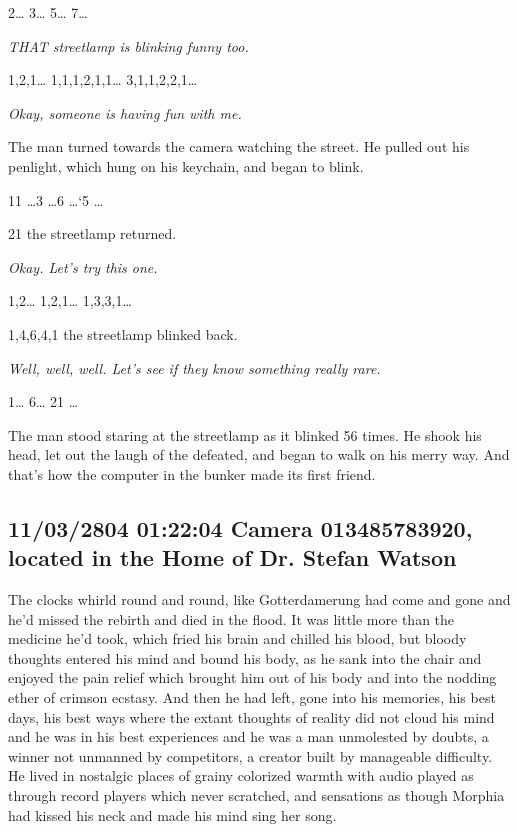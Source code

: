 \documentclass[12pt]{article}
\begin{document}
2\ldots{} 3\ldots{} 5\ldots{} 7\ldots{}

\emph{THAT streetlamp is blinking funny too.}

1,2,1\ldots{} 1,1,1,2,1,1\ldots{} 3,1,1,2,2,1\ldots{}

\emph{Okay, someone is having fun with me.}

The man turned towards the camera watching the street. He pulled out his penlight, which hung on his keychain, and began to blink.

11 \ldots{}3 \ldots{}6 \ldots{}`5 \ldots{}

21 the streetlamp returned.

\emph{Okay. Let's try this one.}

1,2\ldots{} 1,2,1\ldots{} 1,3,3,1\ldots{}

1,4,6,4,1 the streetlamp blinked back.

\emph{Well, well, well. Let's see if they know something really rare.}

1\ldots{} 6\ldots{} 21 \ldots{}

The man stood staring at the streetlamp as it blinked 56 times. He shook his head, let out the laugh of the defeated, and began to walk on his merry way.
And that's how the computer in the bunker made its first friend.

\subsection*{11/03/2804 01:22:04 Camera 013485783920, located in the Home of Dr. Stefan Watson}
\label{sec:org2e9dd43}

The clocks whirld round and round, like Gotterdamerung had come and gone and he'd missed the rebirth and died in the flood. It was little more than the medicine he'd took, which fried his brain and chilled his blood, but bloody thoughts entered his mind and bound his body, as he sank into the chair and enjoyed the pain relief which brought him out of his body and into the nodding ether of crimson ecstasy. And then he had left, gone into his memories, his best days, his best ways where the extant thoughts of reality did not cloud his mind and he was in his best experiences and he was a man unmolested by doubts, a winner not unmanned by competitors, a creator built by manageable difficulty. He lived in nostalgic places of grainy colorized warmth with audio played as through record players which never scratched, and sensations as though Morphia had kissed his neck and made his mind sing her song.
\end{document}

